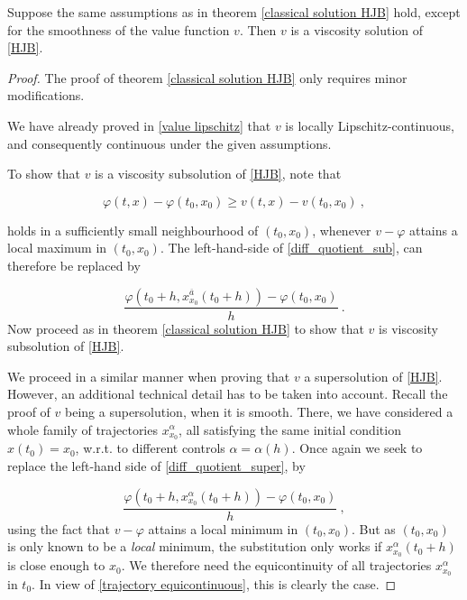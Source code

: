 	\begin{theorem}
		\label{viscosity solution HJB}
		Suppose the same assumptions as in theorem \ref{classical solution HJB} hold, except for the smoothness of the value function $ v $. Then $ v $ is a viscosity solution of \eqref{HJB}.
		
		\begin{proof}
			The proof of theorem \ref{classical solution HJB} only requires minor modifications.
			
			We have already proved in \ref{value lipschitz} that $ v $ is locally Lipschitz-continuous, and consequently continuous under the given assumptions.
			
			To show that $ v $ is a viscosity subsolution of \eqref{HJB}, note that
			
			\begin{equation*}
				\varphi(t, x) - \varphi(t_0, x_0) \geq v(t, x) - v(t_0, x_0) \ ,
			\end{equation*}
			
			holds in a sufficiently small neighbourhood of $ (t_0, x_0) $, whenever $ v - \varphi $ attains a local maximum in $ (t_0, x_0) $.
			The left-hand-side of \eqref{diff_quotient_sub}, can therefore be replaced by
			
			\begin{equation*}
				\frac{\varphi(t_0 + h, x^{\overline{a}}_{x_0}(t_0 + h)) - \varphi(t_0, x_0)}{h} \ .
			\end{equation*}
			Now proceed as in theorem \ref{classical solution HJB} to show that $ v $ is viscosity subsolution of \eqref{HJB}.
			
			We proceed in a similar manner when proving that $ v $ a supersolution of \eqref{HJB}. However, an additional technical detail has to be taken into account. Recall the proof of $ v $ being a supersolution, when it is smooth. There, we have considered a whole family of trajectories $ x_{x_0}^{\alpha} $, all satisfying the same initial condition $ x(t_0) = x_0 $, w.r.t. to different controls $ \alpha = \alpha(h) $. Once again we seek to replace the left-hand side of \eqref{diff_quotient_super}, by

			\begin{equation*}
				\frac{\varphi(t_0 + h, x^{\alpha}_{x_0}(t_0 + h)) - \varphi(t_0, x_0)}{h} \ ,
			\end{equation*}
			using the fact that $ v - \varphi $ attains a local minimum in $ (t_0, x_0) $.
			But as $ (t_0, x_0) $ is only known to be a \emph{local} minimum, the substitution only works if $ x^{\alpha}_{x_0}(t_0 + h) $ is close enough to $ x_0 $. We therefore need the equicontinuity of all trajectories $ x^{\alpha}_{x_0} $ in $ t_0 $. In view of \eqref{trajectory equicontinuous}, this is clearly the case.
		\end{proof}
	\end{theorem}

